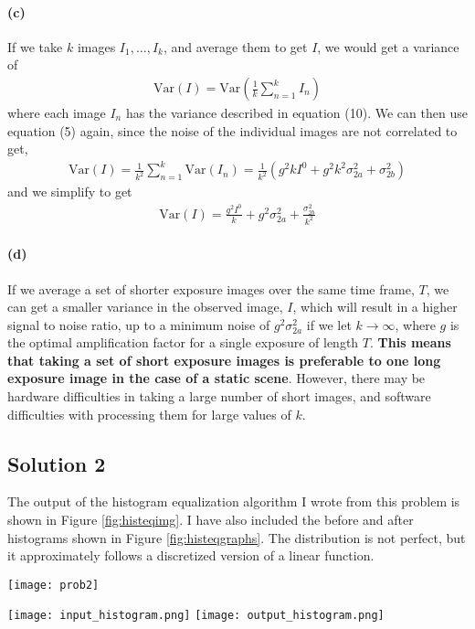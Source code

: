 \documentclass{article}
\newcommand{\solution}[1]{\clearpage \subsection*{Solution #1}}
\newcommand{\spart}[1]{\paragraph{(#1)}}
\begin{document}
\spart{c} If we take $k$ images $I_1, \dots, I_k$, and average them to get $I$, we would get a variance of 
\begin{align}
	\text{Var}(I) = \text{Var}\left(\frac{1}{k} \sum_{n=1}^{k} I_n\right)
\end{align}
where each image $I_n$ has the variance described in equation (10). We can then use equation (5) again, since the noise of the individual images are not correlated to get,
\begin{align}
	\text{Var}(I) = \frac{1}{k^2} \sum_{n=1}^{k} \text{Var}(I_n) = \frac{1}{k^2} \left(g^2 k I^0 + g^2 k^2 \sigma_{2a}^2+\sigma_{2b}^2\right)
\end{align}
and we simplify to get
\begin{align}
	\boxed{\text{Var}(I) = \frac{g^2 I^0}{k} + g^2 \sigma_{2a}^2+\frac{\sigma_{2b}^2}{k^2}}
\end{align}
\spart{d} If we average a set of shorter exposure images over the same time frame, $T$, we can get a smaller variance in the observed image, $I$, which will result in a higher signal to noise ratio, up to a minimum noise of $g^2\sigma_{2a}^2$ if we let $k\rightarrow\infty$, where $g$ is the optimal amplification factor for a single exposure of length $T$. \textbf{This means that taking a set of short exposure images is preferable to one long exposure image in the case of a static scene}. However, there may be hardware difficulties in taking a large number of short images, and software difficulties with processing them for large values of $k$.

\solution{2}

The output of the histogram equalization algorithm I wrote from this problem is shown in Figure \ref{fig:histeqimg}. I have also included the before and after histograms shown in Figure \ref{fig:histeqgraphs}. The distribution is not perfect, but it approximately follows a discretized version of a linear function. 

\begin{figure*}[!h]
  \centering
   \texttt{[image: prob2]}
  \caption{Histogram Equalized Image from Problem 2}
  \label{fig:histeqimg}
\end{figure*}


\begin{figure*}[!h]
	\centering
	\texttt{[image: input\_histogram.png]}
	\texttt{[image: output\_histogram.png]}
	\caption{Original Image Histogram (left) and Post Equalization Histogram (right)}
	\label{fig:histeqgraphs}
\end{figure*}
\end{document}
